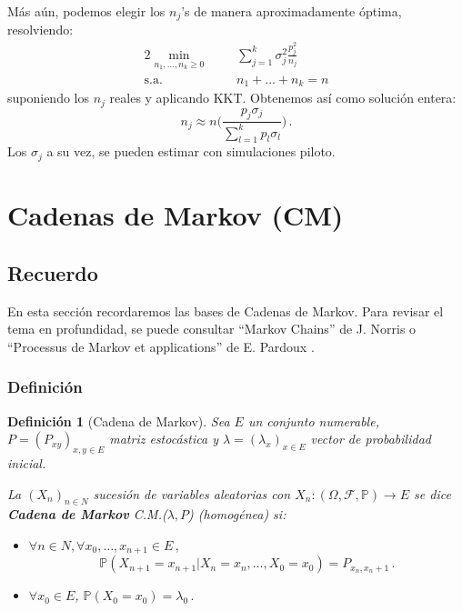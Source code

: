 \documentclass[letterpaper,11pt]{article} %
\def\espacio{\hspace{.25cm}\,}
\theoremstyle{defbreak}
\newtheorem{definition}{Definición}[subsection]
\theoremstyle{propbreak}
\theoremstyle{remark}
\theoremstyle{break}
\def\E{\mathbb{E}}
\def\P{\mathbb{P}}
\def\edp{(\Omega,\mathcal{F},\mathbb{P})}
\begin{document}
\newp Más aún, podemos elegir los $n_j$'s de manera aproximadamente  \'optima,  resolviendo:
\begin{alignat*}{2}
    \displaystyle\min_{n_1,\dots,n_k\geq0}& & \sum^k_{j=1}\sigma^2_j\frac{p_j^2}{n_j}\\
    \mbox{s.a.  }& \mbox{    } & n_1+\dots+n_k=n 
\end{alignat*}
suponiendo los $n_j$ reales y aplicando KKT.  Obtenemos as\'i como soluci\'on entera:
$$ n_j\approx\displaystyle n\bigg(\frac{p_j\sigma_j}{\sum^k_{l=1}p_l\sigma_l}\bigg) \, .$$
Los $\sigma_j$ a su vez, se pueden estimar con simulaciones piloto.


\newpage
\section{Cadenas de Markov (CM)}
\subsection{Recuerdo}
En esta sección recordaremos las bases de Cadenas de Markov. Para revisar el tema en profundidad, se puede consultar  ``Markov Chains'' de J. Norris \cite{norris} o ``Processus de Markov et applications'' de E. Pardoux \cite{pardoux}.
\subsubsection{Definición}
\begin{definition}[Cadena de Markov]
Sea $E$ un conjunto numerable, $P=(P_{xy})_{x,y\in E}$ matriz estocástica y $\lambda=(\lambda_x)_{x\in E}$ vector de probabilidad inicial.

La $(X_n)_{n\in N}$ sucesión de variables aleatorias con $X_n:\edp \to E$ se dice \textbf{Cadena de Markov} C.M.($\lambda,P$) (homog\'enea) si:
\begin{itemize}
    \item $\forall n \in N, \forall x_0,\dots,x_{n+1}\in E \, ,$
    $$ \P(X_{n+1}=x_{n+1}|X_n=x_n,\dots,X_0=x_0) = P_{x_n,x_n+1} \, .$$
    \item $\forall x_0\in E$, $\P(X_0=x_0)=\lambda_0 \, .$
\end{itemize}
\end{definition}
\end{document}
